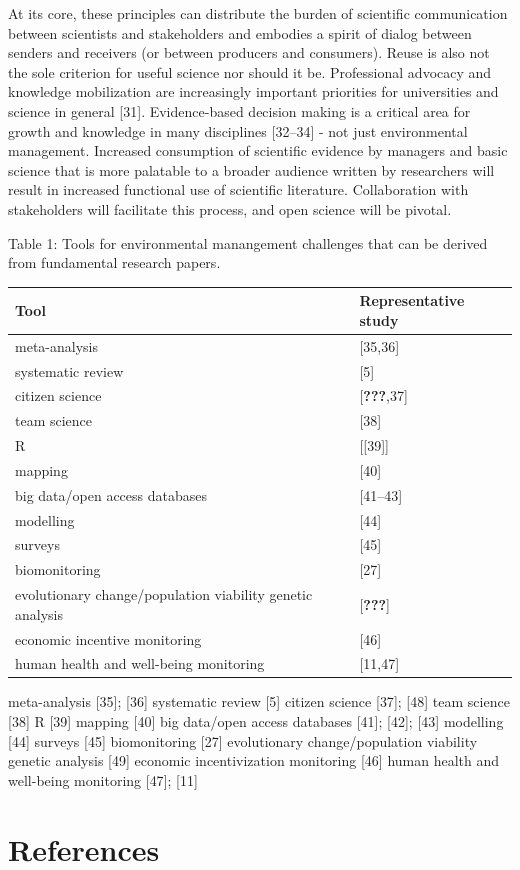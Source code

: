 \documentclass[10pt,letterpaper]{article}
\begin{document}
At its core, these principles can distribute the burden of scientific
communication between scientists and stakeholders and embodies a spirit
of dialog between senders and receivers (or between producers and
consumers). Reuse is also not the sole criterion for useful science nor
should it be. Professional advocacy and knowledge mobilization are
increasingly important priorities for universities and science in
general {[}31{]}. Evidence-based decision making is a critical area for
growth and knowledge in many disciplines {[}32--34{]} - not just
environmental management. Increased consumption of scientific evidence
by managers and basic science that is more palatable to a broader
audience written by researchers will result in increased functional use
of scientific literature. Collaboration with stakeholders will
facilitate this process, and open science will be pivotal.

Table 1: Tools for environmental manangement challenges that can be
derived from fundamental research papers.

\begin{longtable}[]{@{}ll@{}}
\toprule
Tool & Representative study\tabularnewline
\midrule
\endhead
meta-analysis & {[}35,36{]}\tabularnewline
systematic review & {[}5{]}\tabularnewline
citizen science & {[}{\textbf{???}},37{]}\tabularnewline
team science & {[}38{]}\tabularnewline
R & {[}{[}39{]}{]}\tabularnewline
mapping & {[}40{]}\tabularnewline
big data/open access databases & {[}41--43{]}\tabularnewline
modelling & {[}44{]}\tabularnewline
surveys & {[}45{]}\tabularnewline
biomonitoring & {[}27{]}\tabularnewline
evolutionary change/population viability genetic analysis &
{[}{\textbf{???}}{]}\tabularnewline
economic incentive monitoring & {[}46{]}\tabularnewline
human health and well-being monitoring & {[}11,47{]}\tabularnewline
\bottomrule
\end{longtable}

meta-analysis {[}35{]}; {[}36{]} systematic review {[}5{]} citizen
science {[}37{]}; {[}48{]} team science {[}38{]} R {[}39{]} mapping
{[}40{]} big data/open access databases {[}41{]}; {[}42{]}; {[}43{]}
modelling {[}44{]} surveys {[}45{]} biomonitoring {[}27{]} evolutionary
change/population viability genetic analysis {[}49{]} economic
incentivization monitoring {[}46{]} human health and well-being
monitoring {[}47{]}; {[}11{]}

\section*{References}\label{references}
\end{document}
